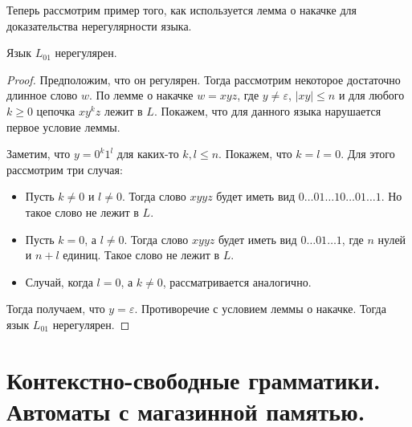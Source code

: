 \documentclass[a4paper,12pt]{article}
\begin{document}
	Теперь рассмотрим пример того, как используется лемма о накачке для доказательства нерегулярности языка. 
	\begin{theorem}
		Язык $L_{01}$ нерегулярен.
	\end{theorem}
	\begin{proof}
		Предположим, что он регулярен. Тогда рассмотрим некоторое достаточно длинное слово $w$. По лемме о накачке $w = xyz$, где $y \neq \varepsilon$, $|xy| \leqslant n$ и для любого $k \geqslant 0$ цепочка $xy^kz$ лежит в $L$. Покажем, что для данного языка нарушается первое условие леммы.
		
		Заметим, что $y = 0^k1^l$ для каких-то $k, l \leqslant n$. Покажем, что $k = l = 0$. Для этого рассмотрим три случая:
		\begin{itemize}
			\item Пусть $k \neq 0$ и $l \neq 0$. Тогда слово $xyyz$ будет иметь вид $0\ldots01\ldots10\ldots01\ldots1$. Но такое слово не лежит в $L$.
			\item Пусть $k = 0$, а $l \neq 0$. Тогда слово $xyyz$ будет иметь вид $0\ldots01\ldots1$, где $n$ нулей и $n + l$ единиц. Такое слово не лежит в $L$.
			\item Случай, когда $l = 0$, а $k \neq 0$, рассматривается аналогично.
		\end{itemize}
		Тогда получаем, что $y = \varepsilon$. Противоречие с условием леммы о накачке. Тогда язык $L_{01}$ нерегулярен.
	\end{proof}
\newpage
	\section{Контекстно-свободные грамматики. Автоматы с магазинной памятью.}
\end{document}
